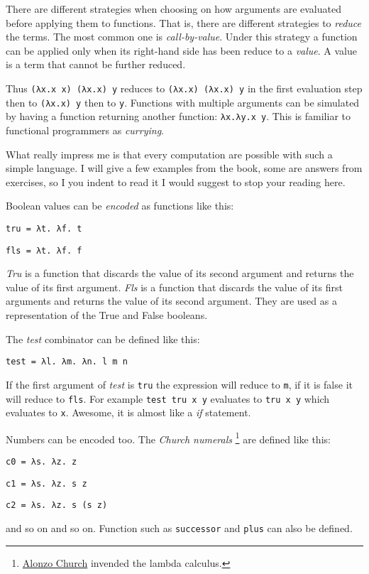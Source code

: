 \documentclass[11pt]{article}
\begin{document}
There are different strategies when choosing on how arguments are
evaluated before applying them to functions. That is, there are
different strategies to \emph{reduce} the terms. The most common one is
\emph{call-by-value}. Under this strategy a function can be applied only
when its right-hand side has been reduce to a \emph{value}. A value is a
term that cannot be further reduced.

Thus \texttt{(λx.x x) (λx.x) y} reduces to \texttt{(λx.x) (λx.x) y} in the first
evaluation step then to \texttt{(λx.x) y} then to \texttt{y}. Functions with
multiple arguments can be simulated by having a function returning
another function: \texttt{λx.λy.x y}. This is familiar to functional
programmers as \emph{currying}.

What really impress me is that every computation are possible with
such a simple language. I will give a few examples from the book, some
are answers from exercises, so I you indent to read it I would suggest
to stop your reading here.

Boolean values can be \emph{encoded} as functions like this:

\texttt{tru = λt. λf. t}

\texttt{fls = λt. λf. f}

\emph{Tru} is a function that discards the value of its second argument
and returns the value of its first argument. \emph{Fls} is a function that
discards the value of its first arguments and returns the value of
its second argument. They are used as a representation of the True
and False booleans.

The \emph{test} combinator can be defined like this:

\texttt{test = λl. λm. λn. l m n}

If the first argument of \emph{test} is \texttt{tru} the expression will reduce to
\texttt{m}, if it is false it will reduce to \texttt{fls}. For example \texttt{test tru x
y} evaluates to \texttt{tru x y} which evaluates to \texttt{x}. Awesome, it is
almost like a \emph{if} statement.

Numbers can be encoded too. The \emph{Church numerals} \footnote{\href{https://en.wikipedia.org/wiki/Alonzo_Church}{Alonzo Church} invended the lambda calculus.} are defined like
this:

\texttt{c0 = λs. λz. z}

\texttt{c1 = λs. λz. s z}

\texttt{c2 = λs. λz. s (s z)}

and so on and so on. Function such as \texttt{successor} and
\texttt{plus} can also be defined.
\end{document}
